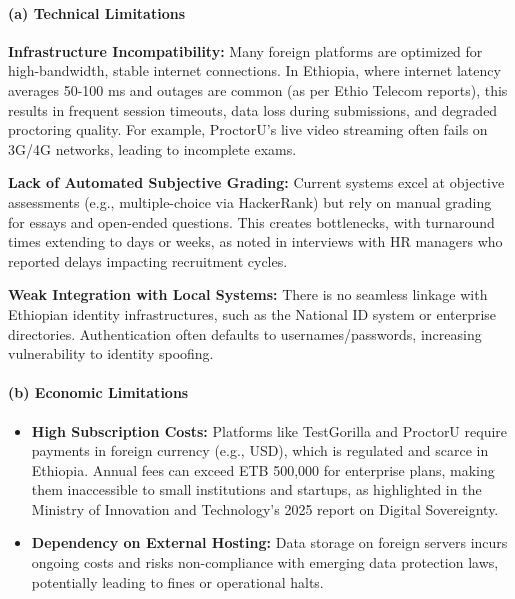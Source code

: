 \paragraph*{(a) Technical Limitations}
\begin{itemize}
    \begin{sloppypar}
        \item \textbf{Infrastructure Incompatibility:} Many foreign platforms are optimized for high-bandwidth, stable internet connections. In Ethiopia, where internet latency averages 50-100 ms and outages are common (as per Ethio Telecom reports), this results in frequent session timeouts, data loss during submissions, and degraded proctoring quality. For example, ProctorU's live video streaming often fails on 3G/4G networks, leading to incomplete exams.
    \end{sloppypar}
	\item \textbf{Lack of Automated Subjective Grading:} Current systems excel at objective assessments (e.g., multiple-choice via HackerRank) but rely on manual grading for essays and open-ended questions. This creates bottlenecks, with turnaround times extending to days or weeks, as noted in interviews with HR managers who reported delays impacting recruitment cycles.
	\item \textbf{Weak Integration with Local Systems:} There is no seamless linkage with Ethiopian identity infrastructures, such as the National ID system or enterprise directories. Authentication often defaults to usernames/passwords, increasing vulnerability to identity spoofing.
\end{itemize}

\paragraph*{(b) Economic Limitations}
\begin{itemize}
    \item \textbf{High Subscription Costs:} Platforms like TestGorilla and ProctorU require payments in foreign currency (e.g., USD), which is regulated and scarce in Ethiopia. Annual fees can exceed ETB 500,000 for enterprise plans, making them inaccessible to small institutions and startups, as highlighted in the Ministry of Innovation and Technology's 2025 report on Digital Sovereignty.
    \item \textbf{Dependency on External Hosting:} Data storage on foreign servers incurs ongoing costs and risks non-compliance with emerging data protection laws, potentially leading to fines or operational halts.
\end{itemize}


